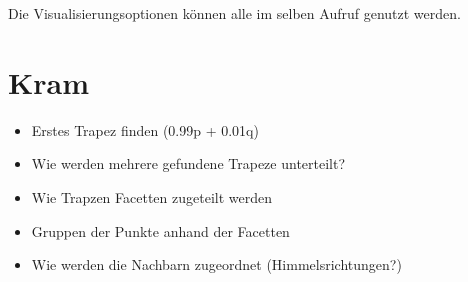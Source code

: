 \documentclass[11pt, a4paper]{article}
\begin{document}
Die Visualisierungsoptionen können alle im selben Aufruf genutzt werden.

\section{Kram}

\begin{itemize}
\item Erstes Trapez finden (0.99p + 0.01q)
\item Wie werden mehrere gefundene Trapeze unterteilt?
\item Wie Trapzen Facetten zugeteilt werden
\item Gruppen der Punkte anhand der Facetten
\item Wie werden die Nachbarn zugeordnet (Himmelsrichtungen?)
\end{itemize}
\end{document}
